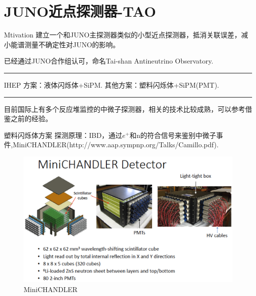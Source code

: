 \documentclass[11pt,compress,xcolor=x11names,UTF8]{beamer}
\begin{document}
\section{JUNO近点探测器-TAO}
\begin{frame}{Mtivation}
建立一个和JUNO主探测器类似的小型近点探测器，抵消关联误差，减小能谱测量不确定性对JUNO的影响。

已经通过JUNO合作组认可，命名Tai-shan Antineutrino Observatory.
\vspace{.1cm}

\hrule{\textwidth}
\vspace{.5cm}
IHEP 方案：液体闪烁体+SiPM.
其他方案：塑料闪烁体+SiPM(PMT).
\vspace{.1cm}

\hrule{\textwidth}
\vspace{.5cm}
目前国际上有多个反应堆监控的中微子探测器，相关的技术比较成熟，可以参考借鉴之前的经验。
\end{frame}
\begin{frame}{塑料闪烁体方案}
探测原理：IBD，通过$e^+$和n的符合信号来鉴别中微子事件,MiniCHANDLER(http://www.aap.sympnp.org/Talks/Camillo.pdf).
\begin{figure}
\centering
\includegraphics[width=.869\textwidth]{hor} %
\caption{MiniCHANDLER}
\end{figure}
\end{frame}
\end{document}
